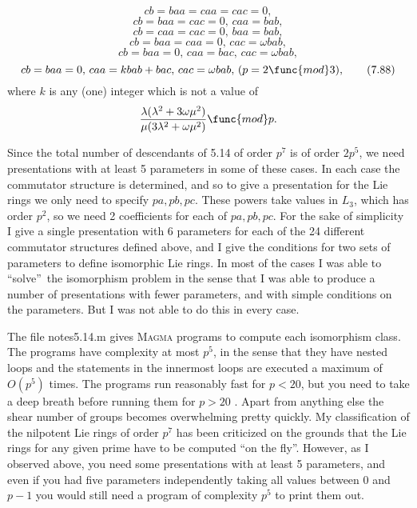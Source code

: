 \documentclass[10pt,thmsa]{article}
\begin{document}
\begin{equation}
cb=baa=caa=cac=0,  \tag{7.83}
\end{equation}%
\begin{equation}
cb=baa=cac=0,\,caa=bab,  \tag{7.84}
\end{equation}%
\begin{equation}
cb=caa=cac=0,\,baa=bab,  \tag{7.85}
\end{equation}%
\begin{equation}
cb=baa=caa=0,\,cac=\omega bab,  \tag{7.86}
\end{equation}%
\begin{equation}
cb=baa=0,\,caa=bac,\,cac=\omega bab,  \tag{7.87}
\end{equation}%
\begin{equation}
cb=baa=0,\,caa=kbab+bac,\,cac=\omega bab,\,(p=2\func{mod}3),  \tag{7.88}
\end{equation}%
where $k$ is any (one) integer which is not a value of 
\[
\frac{\lambda (\lambda ^{2}+3\omega \mu ^{2})}{\mu (3\lambda ^{2}+\omega \mu
^{2})}\func{mod}p. 
\]

Since the total number of descendants of 5.14 of order $p^{7}$ is of order $%
2p^{5}$, we need presentations with at least 5 parameters in some of these
cases. In each case the commutator structure is determined, and so to give a
presentation for the Lie rings we only need to specify $pa,pb,pc$. These
powers take values in $L_{3}$, which has order $p^{2}$, so we need 2
coefficients for each of $pa,pb,pc$. For the sake of simplicity I give a
single presentation with 6 parameters for each of the 24 different
commutator structures defined above, and I give the conditions for two sets
of parameters to define isomorphic Lie rings. In most of the cases I was
able to \textquotedblleft solve\textquotedblright\ the isomorphism problem
in the sense that I was able to produce a number of presentations with fewer
parameters, and with simple conditions on the parameters. But I was not able
to do this in every case.

The file notes5.14.m gives \textsc{Magma} programs to compute each
isomorphism class. The programs have complexity at most $p^{5}$, in the
sense that they have nested loops and the statements in the innermost loops
are executed a maximum of $O(p^{5})$ times. The programs run reasonably fast
for $p<20$, but you need to take a deep breath before running them for $p>20$%
. Apart from anything else the shear number of groups becomes overwhelming
pretty quickly. My classification of the nilpotent Lie rings of order $p^{7}$
has been criticized on the grounds that the Lie rings for any given prime
have to be computed \textquotedblleft on the fly\textquotedblright .
However, as I observed above, you need some presentations with at least 5
parameters, and even if you had five parameters independently taking all
values between $0$ and $p-1$ you would still need a program of complexity $%
p^{5}$ to print them out.
\end{document}
